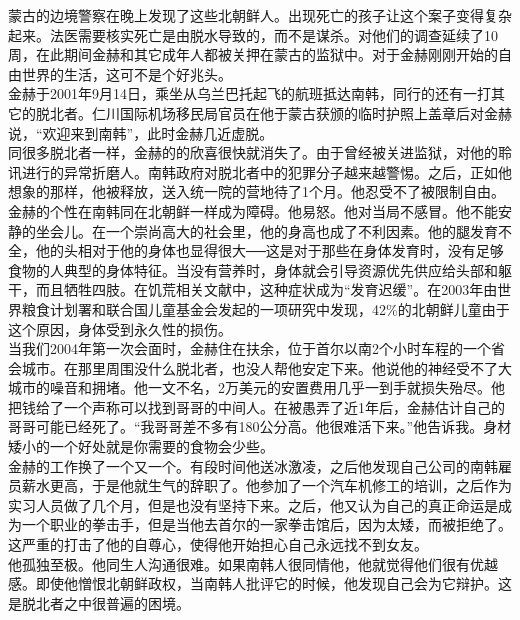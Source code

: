 蒙古的边境警察在晚上发现了这些北朝鲜人。出现死亡的孩子让这个案子变得复杂起来。法医需要核实死亡是由脱水导致的，而不是谋杀。对他们的调查延续了10周，在此期间金赫和其它成年人都被关押在蒙古的监狱中。对于金赫刚刚开始的自由世界的生活，这可不是个好兆头。\\

金赫于2001年9月14日，乘坐从乌兰巴托起飞的航班抵达南韩，同行的还有一打其它的脱北者。仁川国际机场移民局官员在他于蒙古获颁的临时护照上盖章后对金赫说，“欢迎来到南韩”，此时金赫几近虚脱。\\

同很多脱北者一样，金赫的的欣喜很快就消失了。由于曾经被关进监狱，对他的聆讯进行的异常折磨人。南韩政府对脱北者中的犯罪分子越来越警惕。之后，正如他想象的那样，他被释放，送入统一院的营地待了1个月。他忍受不了被限制自由。\\

金赫的个性在南韩同在北朝鲜一样成为障碍。他易怒。他对当局不感冒。他不能安静的坐会儿。在一个崇尚高大的社会里，他的身高也成了不利因素。他的腿发育不全，他的头相对于他的身体也显得很大──这是对于那些在身体发育时，没有足够食物的人典型的身体特征。当没有营养时，身体就会引导资源优先供应给头部和躯干，而且牺牲四肢。在饥荒相关文献中，这种症状成为“发育迟缓”。在2003年由世界粮食计划署和联合国儿童基金会发起的一项研究中发现，42\%的北朝鲜儿童由于这个原因，身体受到永久性的损伤。\\

当我们2004年第一次会面时，金赫住在扶余，位于首尔以南2个小时车程的一个省会城市。在那里周围没什么脱北者，也没人帮他安定下来。他说他的神经受不了大城市的噪音和拥堵。他一文不名，2万美元的安置费用几乎一到手就损失殆尽。他把钱给了一个声称可以找到哥哥的中间人。在被愚弄了近1年后，金赫估计自己的哥哥可能已经死了。“我哥哥差不多有180公分高。他很难活下来。”他告诉我。身材矮小的一个好处就是你需要的食物会少些。\\

金赫的工作换了一个又一个。有段时间他送冰激凌，之后他发现自己公司的南韩雇员薪水更高，于是他就生气的辞职了。他参加了一个汽车机修工的培训，之后作为实习人员做了几个月，但是也没有坚持下来。之后，他又认为自己的真正命运是成为一个职业的拳击手，但是当他去首尔的一家拳击馆后，因为太矮，而被拒绝了。这严重的打击了他的自尊心，使得他开始担心自己永远找不到女友。\\

他孤独至极。他同生人沟通很难。如果南韩人很同情他，他就觉得他们很有优越感。即使他憎恨北朝鲜政权，当南韩人批评它的时候，他发现自己会为它辩护。这是脱北者之中很普遍的困境。\\

